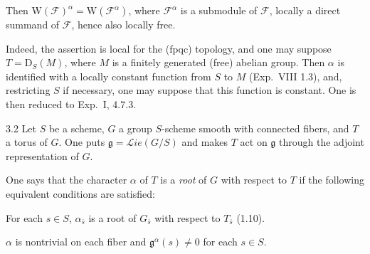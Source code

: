 \begin{lemma}{}\label{XIX.3.1.lemma}
{\renewcommand{\thefootnote}{(27)}}%
Then $\mathrm W(\mathcal F)^\alpha=\mathrm W(\mathcal F^\alpha)$, where $\mathcal F^\alpha$ is a submodule of $\mathcal F$, locally a direct summand of $\mathcal F$, hence also locally free.
\end{lemma}
Indeed, the assertion is local for the (fpqc) topology, and one may suppose $T=\mathrm D_S(M)$, where $M$ is a finitely generated (free) abelian group. Then $\alpha$ is identified with a locally constant function from $S$ to $M$ (Exp.~VIII 1.3), and, restricting $S$ if necessary, one may suppose that this function is constant. One is then reduced to Exp.~I, 4.7.3.

\begin{definition}{3.2}\label{XIX.3.2}
Let $S$ be a scheme, $G$ a group $S$-scheme smooth with connected fibers,{\renewcommand{\thefootnote}{(28)}} and $T$ a torus of $G$. One puts $\mathfrak g=\mathcal{L}\!ie(G/S)$ and makes $T$ act on $\mathfrak g$ through the adjoint representation of $G$.

One says that the character $\alpha$ of $T$ is a \emph{root} of $G$ with respect to $T$ if the following equivalent conditions are satisfied:
\begin{enumeratei}
\item For each $s\in S$, $\alpha_{\overline{s}}$ is a root of $G_{\overline{s}}$ with respect to $T_{\overline{s}}$ (1.10).
\item $\alpha$ is nontrivial on each fiber and $\mathfrak g^\alpha(s)\ne0$ for each $s\in S$.
\end{enumeratei}
\end{definition}

